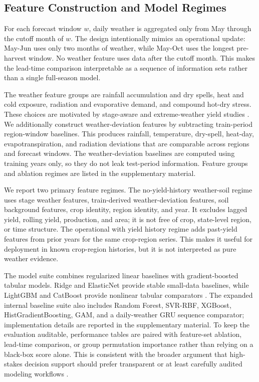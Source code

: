 \documentclass[wcp]{jmlr}
\begin{document}
\subsection{Feature Construction and Model Regimes}

For each forecast window $w$, daily weather is aggregated only from May through the cutoff month of $w$. The design intentionally mimics an operational update: May-Jun uses only two months of weather, while May-Oct uses the longest pre-harvest window. No weather feature uses data after the cutoff month. This makes the lead-time comparison interpretable as a sequence of information sets rather than a single full-season model.

The weather feature groups are rainfall accumulation and dry spells, heat and cold exposure, radiation and evaporative demand, and compound hot-dry stress. These choices are motivated by stage-aware and extreme-weather yield studies \citep{schierhorn2021developmentalStages,heino2023hotDryExtremes,heilemann2024lassoExtremes}. We additionally construct weather-deviation features by subtracting train-period region-window baselines. This produces rainfall, temperature, dry-spell, heat-day, evapotranspiration, and radiation deviations that are comparable across regions and forecast windows. The weather-deviation baselines are computed using training years only, so they do not leak test-period information. Feature groups and ablation regimes are listed in the supplementary material.

We report two primary feature regimes. The no-yield-history weather-soil regime uses stage weather features, train-derived weather-deviation features, soil background features, crop identity, region identity, and year. It excludes lagged yield, rolling yield, production, and area; it is not free of crop, state-level region, or time structure. The operational with yield history regime adds past-yield features from prior years for the same crop-region series. This makes it useful for deployment in known crop-region histories, but it is not interpreted as pure weather evidence.

The model suite combines regularized linear baselines with gradient-boosted tabular models. Ridge and ElasticNet provide stable small-data baselines, while LightGBM and CatBoost provide nonlinear tabular comparators \citep{ke2017lightgbm,prokhorenkova2018catboost}. The expanded internal baseline suite also includes Random Forest, SVR-RBF, XGBoost, HistGradientBoosting, GAM, and a daily-weather GRU sequence comparator; implementation details are reported in the supplementary material. To keep the evaluation auditable, performance tables are paired with feature-set ablation, lead-time comparison, or group permutation importance rather than relying on a black-box score alone. This is consistent with the broader argument that high-stakes decision support should prefer transparent or at least carefully audited modeling workflows \citep{rudin2022blackboxBrief}.
\end{document}

